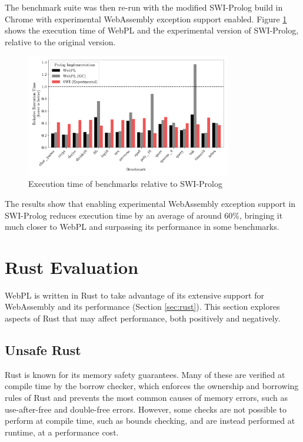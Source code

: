 The benchmark suite was then re-run with the modified SWI-Prolog build in Chrome with experimental WebAssembly exception support enabled. Figure \ref{fig:swi-prolog-exception} shows the execution time of WebPL and the experimental version of SWI-Prolog, relative to the original version.

\begin{figure}[H]
\centering
\includegraphics[width=0.8\textwidth]{relative_performance_exnref.pdf}
\caption{Execution time of benchmarks relative to SWI-Prolog}
\label{fig:swi-prolog-exception}
\end{figure}

The results show that enabling experimental WebAssembly exception support in SWI-Prolog reduces execution time by an average of around 60\%, bringing it much closer to WebPL and surpassing its performance in some benchmarks.

\section{Rust Evaluation}

\label{sec:rust-evaluation}

WebPL is written in Rust to take advantage of its extensive support for WebAssembly and its performance (Section \ref{sec:rust}). This section explores aspects of Rust that may affect performance, both positively and negatively.

\subsection{Unsafe Rust}

Rust is known for its memory safety guarantees. Many of these are verified at compile time by the borrow checker, which enforces the ownership and borrowing rules of Rust and prevents the most common causes of memory errors, such as use-after-free and double-free errors. However, some checks are not possible to perform at compile time, such as bounds checking, and are instead performed at runtime, at a performance cost.

